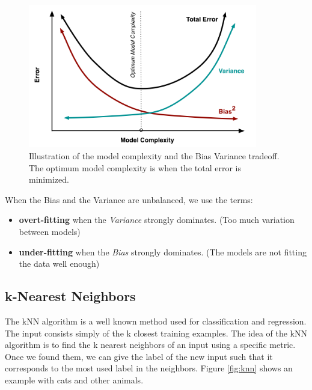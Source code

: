 \begin{figure}[H] %
\centerline{
\includegraphics[width=10cm]{img/07/biasvariance}
}
\caption{\label{BV} 
Illustration of the model complexity and the Bias Variance tradeoff. The optimum model complexity is when the total error is minimized.
}
\end{figure}
When the Bias and the Variance are unbalanced, we use the terms:
\begin{itemize}
 \item {\bf overt-fitting} when the \emph{Variance} strongly dominates. (Too much variation between models)
 \item {\bf under-fitting} when the \emph{Bias} strongly dominates. (The models are not fitting the data well enough)
\end{itemize}


\subsection{k-Nearest Neighbors}

The kNN algorithm is a well known method used for classification and regression. The input consists simply of the k closest training examples. The idea of the kNN algorithm is to find the k nearest neighbors of an input using a specific metric. Once we found them, we can give the label of the new input such that it corresponds to the most used label in the neighbors. Figure \ref{fig:knn} shows an example with cats and other animals.

